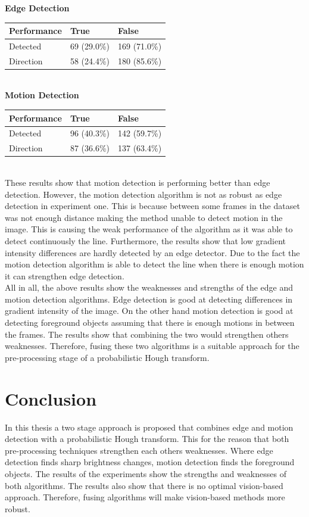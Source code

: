 \documentclass[a4paper]{article}
\begin{document}
\noindent\textbf{Edge Detection}\\
\begin{tabular}{| l | l | l |}
\hline
\textbf{Performance} & True & False\\
\hline
Detected  & 69 (29.0\%) & 169 (71.0\%)\\
\hline
Direction & 58 (24.4\%) & 180 (85.6\%) \\
\hline
\end{tabular}\\

\noindent\textbf{Motion Detection}\\
\begin{tabular}{| l | l | l |}
\hline
\textbf{Performance} & True & False\\
\hline
Detected  & 96 (40.3\%) & 142 (59.7\%)\\
\hline
Direction & 87 (36.6\%) & 137 (63.4\%) \\
\hline
\end{tabular}\\

These results show that motion detection is performing better than edge detection. However, the motion detection algorithm is not as robust as edge detection in experiment one. This is because between some frames in the dataset was not enough distance making the method unable to detect motion in the image. This is causing the weak performance of the algorithm as it was able to detect continuously the line. Furthermore, the results show that low gradient intensity differences are hardly detected by an edge detector. Due to the fact the motion detection algorithm is able to detect the line when there is enough motion it can strengthen edge detection.\\

\noindent All in all, the above results show the weaknesses and strengths of the edge and motion detection algorithms. Edge detection is good at detecting differences in gradient intensity of the image. On the other hand motion detection is good at detecting foreground objects assuming that there is enough motions in between the frames. The results show that combining the two would strengthen others weaknesses. Therefore, fusing these two algorithms is a suitable approach for the pre-processing stage of a probabilistic Hough transform.



\newpage
\section{Conclusion}
\label{CONCLUSION}
In this thesis a two stage approach is proposed that combines edge and motion detection with a probabilistic Hough transform. This for the reason that both pre-processing techniques strengthen each others weaknesses. Where edge detection finds sharp brightness changes, motion detection finds the foreground objects. The results of the experiments show the strengths and weaknesses of both algorithms. The results also show that there is no optimal vision-based approach. Therefore, fusing algorithms will make vision-based methods more robust.
\end{document}
